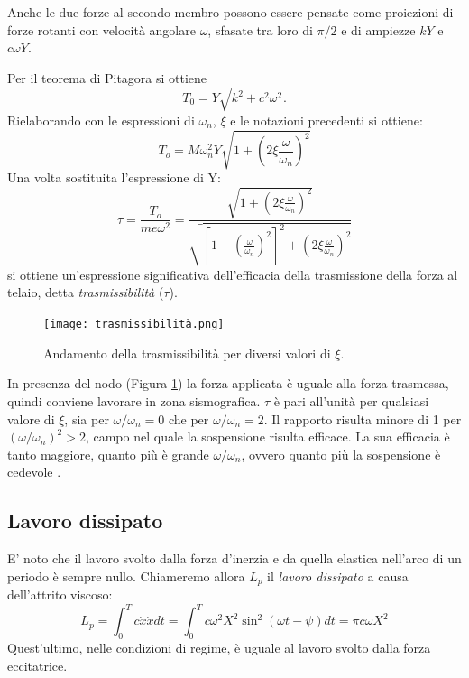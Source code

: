 Anche le due forze al secondo membro possono essere pensate come proiezioni di forze rotanti con velocità angolare $\omega$, sfasate tra loro di $\pi/2$ e di ampiezze $k Y$ e $c\omega Y$.

Per il teorema di Pitagora si ottiene
\begin{equation}
    T_0=Y\sqrt{k^2+c^2\omega^2}.
\end{equation}
Rielaborando con le espressioni di $\omega_n$, $\xi$ e le notazioni precedenti si ottiene:
\begin{equation}
    T_o=M\omega_n^2Y\sqrt{1+(2\xi \frac{\omega}{\omega_n})^2}
\end{equation}
Una volta sostituita l'espressione di Y:
\begin{equation}
  \tau =  \frac{T_o}{me\omega^2}=\frac{\sqrt{1+(2\xi \frac{\omega}{\omega_n})^2}}{\sqrt{[1-(\frac{\omega}{\omega_n})^2]^2+(2\xi\frac{\omega}{\omega_n})^2}}
\end{equation}
si ottiene un'espressione significativa dell'efficacia della trasmissione della forza al telaio, detta \textit{trasmissibilità} ($\tau$).
\begin{figure}[h]
    \centering
    \texttt{[image: trasmissibilità.png]}
    \caption{Andamento della trasmissibilità per diversi valori di $\xi$.}
    \label{trasmissibilità}
\end{figure}
In presenza del nodo (Figura \ref{trasmissibilità}) la forza applicata è uguale alla forza trasmessa, quindi conviene lavorare in zona sismografica. $\tau$ è pari all'unità per qualsiasi valore di $\xi$, sia per $\omega/\omega_n=0$ che per $\omega/\omega_n=2$. Il rapporto risulta minore di 1 per $(\omega/\omega_n)^2>2$, campo nel quale la sospensione risulta efficace. La sua efficacia è tanto maggiore, quanto più è grande $\omega/\omega_n$, ovvero quanto più la sospensione è cedevole \cite{meneghetti2010lezioni}.
\subsection{Lavoro dissipato}
E' noto che il lavoro svolto dalla forza d'inerzia e da quella elastica nell'arco di un periodo è sempre nullo. Chiameremo allora $L_p$ il \textit{lavoro dissipato} a causa dell'attrito viscoso:
\begin{equation}
    L_p=\int_{0}^{T}c\dot x\dot x dt=\int_{0}^{T}c\omega^2 X^2 \sin^2(\omega t-\psi)dt=\pi c\omega X^2
\end{equation}
 Quest'ultimo, nelle condizioni di regime, è uguale al lavoro svolto dalla forza eccitatrice.